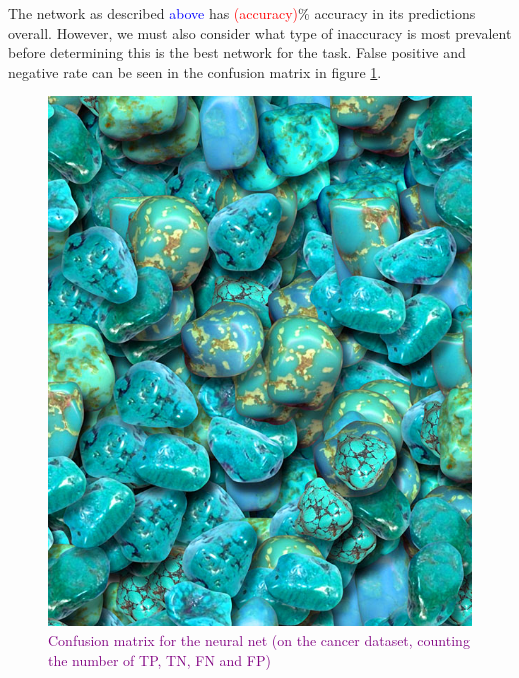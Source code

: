 The network as described \textcolor{blue}{above} has \textcolor{red}{(accuracy)}\% accuracy in its predictions overall. However, we must also consider what type of inaccuracy is most prevalent before determining this is the best network for the task. False positive and negative rate can be seen in the confusion matrix in figure \ref{fig:confusionmatrix}.
\begin{figure}
    \centering
    \includegraphics[width=\linewidth]{figures/placeholders/confusionmatrix.png}
    \caption{\textcolor{purple}{Confusion matrix for the neural net (on the cancer dataset, counting the number of TP, TN, FN and FP)}}
    \label{fig:confusionmatrix}
\end{figure}



